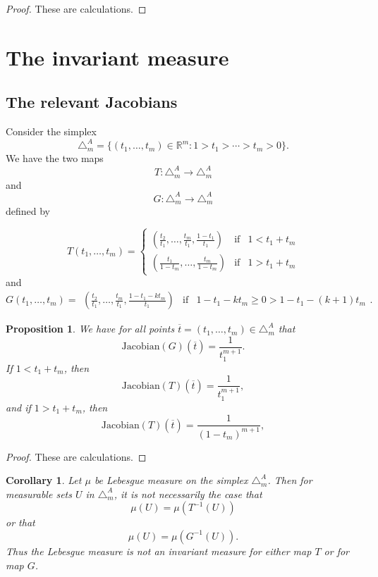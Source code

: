 \documentclass[12pt,oneside,openany]{article}
\newtheorem{prop}[theorem]{Proposition}
\newtheorem{corollary}[theorem]{Corollary}
\def\R{{\mathbb R}} %
\begin{document}
\begin{proof}These are calculations.
\end{proof}





\section{The invariant measure} \label{The invariant measure} 

\subsection{The relevant Jacobians}
 Consider
the simplex 
$$\triangle_m^A= \{ (t_1, \ldots , t_m) \in \R^m:  1>t_1 > \cdots > t_m >0\}.$$
We have the two maps
$$T:\triangle_m^A \rightarrow \triangle_m^A$$
and
$$G:\triangle_m^A \rightarrow \triangle_m^A$$
defined by 

$$T(t_1, \ldots, t_m) = \left\{  \begin{array}{ccc} \left( \frac{t_2}{t_1} , \ldots, \frac{t_m}{t_1}, \frac{1-t_1}{t_1} \right)& \mbox{if}& 1< t_1 + t_m  \\
 \left( \frac{t_1}{ 1 - t_m} , \ldots, \frac{t_m}{1- t_m} \right)& \mbox{if}& 1> t_1 + t_m \end{array} \right.$$
 and 
 $$G(t_1, \ldots, t_m) =   \begin{array}{ccc} \left( \frac{t_2}{t_1} , \ldots, \frac{t_m}{t_1}, \frac{1-t_1 - k t_m}{t_1} \right)& \mbox{if}& 1-t_1-kt_m \geq 0 >1-t_1-(k+1)t_m   \end{array} .$$
 
 
\begin{prop} We have for all points $\overline{t} = (t_1, \ldots, t_m) \in \triangle_m^A$ that 
$$\mbox{Jacobian}(G) (\overline{t}) = \frac{1}{t_1^{m+1}}.$$
If $ 1< t_1+ t_m$, then 
$$\mbox{Jacobian}(T) (\overline{t}) = \frac{1}{t_1^{m+1}},$$
and if $1>t_1+ t_m$, then
$$\mbox{Jacobian}(T) (\overline{t}) = \frac{1}{(1-t_m)^{m+1}},$$
\end{prop}
\begin{proof}
These are calculations.
\end{proof}
 \begin{corollary} Let $\mu$ be Lebesgue measure on the simplex $\triangle_m^A$.  Then for measurable sets $U$ in $\triangle_m^A$, it is not necessarily the case that 
 $$\mu(U) = \mu(T^{-1}(U))$$
 or that 
 $$\mu(U) = \mu(G^{-1}(U)).$$
Thus the Lebesgue measure is not an invariant measure for either  map $T$ or for map $G$.
 \end{corollary}
 
\end{document}
